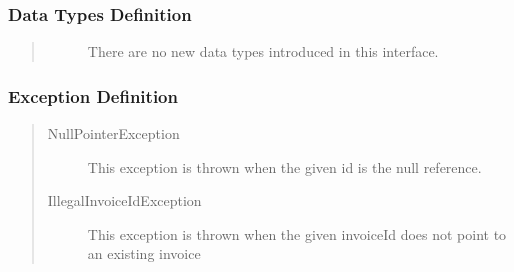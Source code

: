 \subsubsection{Data Types Definition}

\begin{quote}
	\begin{description}
		\item[]There are no new data types introduced in this interface. 
	\end{description} 
\end{quote}

\subsubsection{Exception Definition} 

\begin{quote}
	\begin{description}
		\item[NullPointerException] This exception is thrown when the given id is the
		null reference.
		\item[IllegalInvoiceIdException] This exception is thrown when the given
		invoiceId does not point to an existing invoice
	\end{description} 
\end{quote}